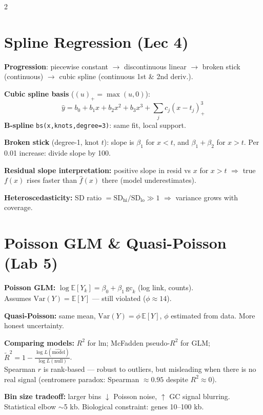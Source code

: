 \documentclass[12pt,a4paper]{article}
\newcommand{\E}{\mathbb{E}}
\newcommand{\Var}{\mathrm{Var}}
\newcommand{\gc}{\text{gc}}
\begin{document}
\begin{multicols}{2}
\section*{Spline Regression (Lec 4)}

\textbf{Progression}: piecewise constant $\to$ discontinuous linear $\to$ broken stick (continuous) $\to$ cubic spline (continuous 1st \& 2nd deriv.).

\textbf{Cubic spline basis} ($(u)_+=\max(u,0)$):
\[ \hat y = b_0 + b_1 x + b_2 x^2 + b_3 x^3 + \textstyle\sum_j c_j(x-t_j)^3_+ \]
\textbf{B-spline} \texttt{bs(x,knots,degree=3)}: same fit, local support.

\textbf{Broken stick} (degree-1, knot $t$): slope is $\beta_1$ for $x<t$, and $\beta_1+\beta_2$ for $x>t$. Per 0.01 increase: divide slope by 100.

\textbf{Residual slope interpretation:} positive slope in resid vs $x$ for $x>t$ $\Rightarrow$ true $f(x)$ rises faster than $\hat f(x)$ there (model underestimates).

\textbf{Heteroscedasticity:} SD ratio $= \text{SD}_\text{hi}/\text{SD}_\text{lo} \gg 1$ $\Rightarrow$ variance grows with coverage.

\section*{Poisson GLM \& Quasi-Poisson (Lab 5)}

\textbf{Poisson GLM:} $\log\E[Y_k] = \beta_0 + \beta_1\,\gc_k$ (log link, counts).\\
Assumes $\Var(Y) = \E[Y]$ — still violated ($\phi \approx 14$).

\textbf{Quasi-Poisson:} same mean, $\Var(Y) = \phi\,\E[Y]$, $\phi$ estimated from data. More honest uncertainty.

\textbf{Comparing models:} $R^2$ for lm; McFadden pseudo-$R^2$ for GLM;
$\displaystyle\tilde R^2 = 1 - \frac{\log L(\hat{\text{model}})}{\log L(\text{null})}$.\\
Spearman $r$ is rank-based — robust to outliers, but misleading when there is no real signal (centromere paradox: Spearman $\approx 0.95$ despite $R^2 \approx 0$).

\textbf{Bin size tradeoff:} larger bins $\downarrow$ Poisson noise, $\uparrow$ GC signal blurring. Statistical elbow $\sim$5 kb. Biological constraint: genes 10--100 kb.


\end{multicols}
\end{document}
